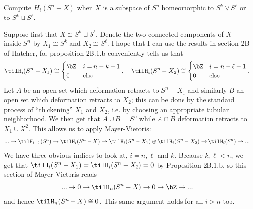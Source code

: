 \begin{homework}[e]
   Compute $H_i(S^n - X)$ when $X$ is a subspace of $S^n$ homeomorphic to $S^k\vee S^\ell$ or to $S^k \sqcup S^\ell$.
  \begin{prf}
    Suppose first that $X \cong S^k \sqcup S^\ell$. Denote the two connected components of $X$ inside $S^n$ by $X_1 \cong S^k$ and $X_2 \cong S^\ell$. I hope that I can use the results in section 2B of Hatcher, for proposition 2B.1.b conveniently tells us that
    \begin{align*}
      \tilH_i(S^n - X_1) \cong
      \begin{cases}
        \bZ & i = n - k - 1 \\
        0 & \text{else}
      \end{cases}, \hspace{1em}
      \tilH_i(S^n - X_2) \cong
      \begin{cases}
        \bZ & i = n - \ell - 1 \\
        0 & \text{else}
      \end{cases}.
    \end{align*}
    Let $A$ be an open set which deformation retracts to $S^n - X_1$ and similarly $B$ an open set which deformation retracts to $X_2$; this can be done by the standard process of ``thickening'' $X_1$ and $X_2$, i.e. by choosing an appropriate tubular neighborhood. We then get that $A \cup B = S^n$ while $A\cap B$ deformation retracts to $X_1\cup X^2$. This allows us to apply Mayer-Vietoris:
    \begin{align*}
      ...\to \tilH_{i+1}(S^n)\to \tilH_i(S^n - X) \to \tilH_i(S^n - X_1) \oplus \tilH_i(S^n - X_2) \to \tilH_i(S^n) \to ...
    \end{align*}
    We have three obvious indices to look at, $i = n,\ell $ and $k$. Because $k,\ell < n$, we get that $\tilH_i(S^n - X_1) = \tilH_i(S^n - X_2) = 0$ by Proposition 2B.1.b, so this section of Mayer-Vietoris reads
    \begin{align*}
      ... \to 0 \to \tilH_n(S^n - X) \to 0 \to \bZ \to ...
    \end{align*}
    and hence $\tilH_n(S^n - X)\cong 0$. This same argument holds for all $i > n$ too.


\end{prf}
\end{homework}
